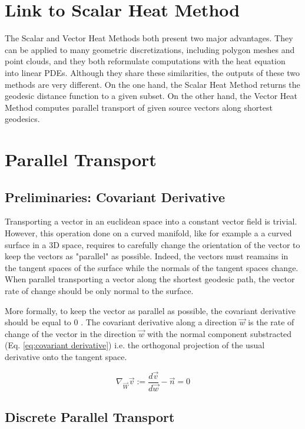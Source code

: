 \documentclass[sigconf]{acmart}
\begin{document}
\section{Link to Scalar Heat Method}
The Scalar and Vector Heat Methods both present two major advantages. 
They can be applied to many geometric discretizations, including polygon meshes and point clouds, and they both reformulate computations with the heat equation into linear PDEs. Although they share these similarities, the outputs of these two methods are very different. On the one hand, the Scalar Heat Method returns the geodesic distance function to a given subset. On the other hand, the Vector Heat Method computes parallel transport of given source vectors along shortest geodesics. 

\section{Parallel Transport}

\subsection{Preliminaries: Covariant Derivative}
Transporting a vector in an euclidean space into a constant vector field is trivial. However, this operation done on a curved manifold, like for example a a curved surface in a 3D space, requires to carefully change the orientation of the vector to keep the vectors as "parallel" as possible. Indeed, the vectors must reamains in the tangent spaces of the surface while the normals of the tangent spaces change. When parallel transporting a vector along the shortest geodesic path, the vector rate of change should be only normal to the surface. 

More formally, to keep the vector as parallel as possible, the covariant derivative should be equal to 0 \cite{youtube_video}. The covariant derivative along a direction $\vec{w} $ is the rate of change of the vector in the direction $\vec{w}$ with the normal component substracted (Eq. \ref{eq:covariant derivative}) i.e. the orthogonal projection of the usual derivative onto the tangent space.

\begin{equation}
  \nabla_{\vec{W}}\vec{v}:=\frac{d\vec{v}}{d\vec{w}}-\vec{n}=0
  \label{eq:covariant derivative}
\end{equation}

\subsection{Discrete Parallel Transport}
\end{document}
